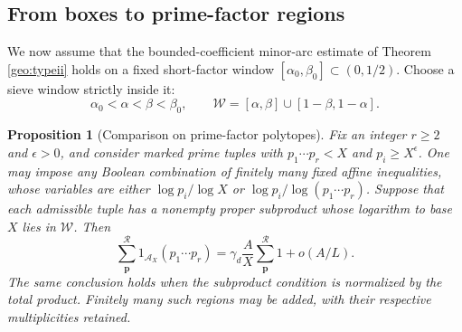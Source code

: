 \documentclass[11pt,a4paper]{article}
\theoremstyle{paperplain}
\newtheorem{proposition}[theorem]{Proposition}
\numberwithin{equation}{section}
\begin{document}
\subsection{From boxes to prime-factor regions}

We now assume that the bounded-coefficient minor-arc estimate of
Theorem \ref{geo:typeii} holds on a fixed short-factor window
$[\alpha_0,\beta_0]\subset(0,1/2)$.
Choose a sieve window strictly inside it:
\begin{equation}\label{arith:window}
 \alpha_0<\alpha<\beta<\beta_0,
 \qquad \mathcal W=[\alpha,\beta]\cup[1-\beta,1-\alpha].
\end{equation}

\begin{proposition}[Comparison on prime-factor polytopes]\label{arith:polytope}
Fix an integer $r\ge2$ and $\epsilon>0$, and consider marked prime tuples with
$p_1\cdots p_r<X$ and $p_i\ge X^\epsilon$.
One may impose any Boolean combination of finitely many fixed affine
inequalities, whose variables are either $\log p_i/\log X$ or
$\log p_i/\log(p_1\cdots p_r)$.
Suppose that each admissible tuple has a nonempty proper subproduct
whose logarithm to base $X$ lies in $\mathcal W$. Then
\begin{equation}\label{arith:polytopeformula}
 \sum_{\boldsymbol p}^{\mathcal R}
       1_{\mathcal A_X}(p_1\cdots p_r)
 =\gamma_d\frac AX\sum_{\boldsymbol p}^{\mathcal R}1
       +o(A/L).
\end{equation}
The same conclusion holds when the subproduct condition is normalized
by the total product. Finitely many such regions may be added, with
their respective multiplicities retained.
\end{proposition}
\end{document}
